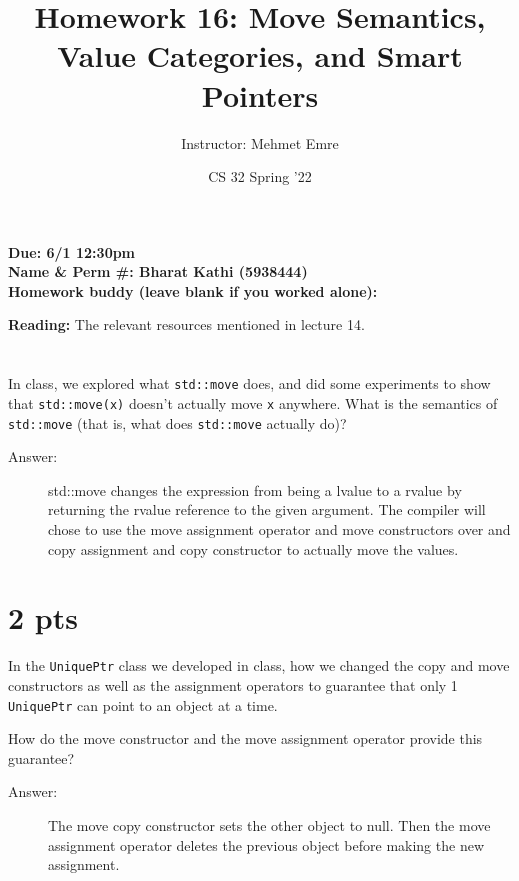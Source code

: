 \documentclass[11pt]{article}
\author{Instructor: Mehmet Emre}
\date{CS 32 Spring '22}
\title{Homework 16: Move Semantics, Value Categories, and Smart Pointers}
\begin{document}
\maketitle
\textbf{Due: 6/1 12:30pm} \\ 
\vspace{1em}
\textbf{Name \& Perm \#: Bharat Kathi (5938444)} \\ 
\textbf{Homework buddy (leave blank if you worked alone):}

\textbf{Reading:} The relevant resources mentioned in lecture 14.

\section{}
\label{sec:org974f2d1}
In class, we explored what \texttt{std::move} does, and did some experiments to show
that \texttt{std::move(x)} doesn't actually move \texttt{x} anywhere. What is the semantics of \texttt{std::move} (that is, what does \texttt{std::move} actually do)?

\begin{description}
    \item[Answer:] std::move changes the expression from being a lvalue to a rvalue by returning the rvalue reference to the given argument. The compiler will chose to use the move assignment operator and move constructors over and copy assignment and copy constructor to actually move the values.
\end{description}

\section{2 pts}
\label{sec:orgde6743a}

In the \texttt{UniquePtr} class we developed in class, how we changed the copy and move
constructors as well as the assignment operators to guarantee that only 1
\texttt{UniquePtr} can point to an object at a time.

How do the move constructor and the move assignment operator provide this guarantee?

\begin{description}
    \item[Answer:] The move copy constructor sets the other object to null. Then the move assignment operator deletes the previous object before making the new assignment.
\end{description}

\section{}
\label{sec:org0750749}
\end{document}
